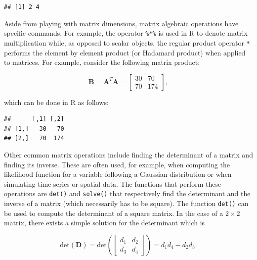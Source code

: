\documentclass[12pt,]{krantz}
\newenvironment{Shaded}{\begin{snugshade}}{\end{snugshade}}
\newcommand{\StringTok}[1]{\textcolor[rgb]{0.5,0.5,0.5}{#1}}
\newcommand{\OperatorTok}[1]{\textcolor[rgb]{0.43,0.43,0.43}{\textbf{#1}}}
\newcommand{\NormalTok}[1]{#1}
\begin{document}
\begin{verbatim}
## [1] 2 4
\end{verbatim}

Aside from playing with matrix dimensions, matrix algebraic operations
have specific commands. For example, the operator \texttt{\%*\%} is used
in R to denote matrix multiplication while, as opposed to scalar
objects, the regular product operator \texttt{*} performs the element by
element product (or Hadamard product) when applied to matrices. For
example, consider the following matrix product:

\begin{equation*}
  \mathbf{B} = \mathbf{A}^T \mathbf{A} =   \left[
\begin{matrix}
30 & 70\\
70 & 174
\end{matrix}
\right],
\end{equation*}

which can be done in R as follows:

\begin{Shaded}
\end{Shaded}

\begin{verbatim}
##      [,1] [,2]
## [1,]   30   70
## [2,]   70  174
\end{verbatim}

Other common matrix operations include finding the determinant of a
matrix and finding its inverse. These are often used, for example, when
computing the likelihood function for a variable following a Gaussian
distribution or when simulating time series or spatial data. The
functions that perform these operations are \texttt{det()} and
\texttt{solve()} that respectively find the determinant and the inverse
of a matrix (which necessarily has to be square). The function
\texttt{det()} can be used to compute the determinant of a square
matrix. In the case of a \(2 \times 2\) matrix, there exists a simple
solution for the determinant which is

\begin{equation*}
\text{det} \left( \mathbf{D} \right) = \text{det} \left( \left[
\begin{matrix}
d_1 & d_2\\
d_3 & d_4
\end{matrix}
\right] \right) = d_1 d_4 - d_2 d_3.
\end{equation*}
\end{document}
